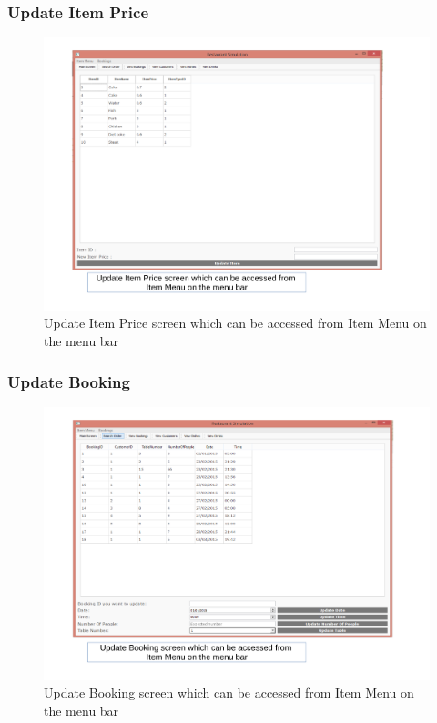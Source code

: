 \begin{landscape}
\subsubsection{Update Item Price}
\begin{figure}[H]
    \includegraphics[width = 15cm]{./Maintenance/images/screen7}
    \caption{Update Item Price screen which can be accessed from Item Menu on the menu bar} \label{fig:screen7}
\end{figure}

\subsubsection{Update Booking}
\begin{figure}[H]
    \includegraphics[width = 15cm]{./Maintenance/images/screen8}
    \caption{Update Booking screen which can be accessed from Item Menu on the menu bar} \label{fig:screen8}
\end{figure}


\end{landscape}
